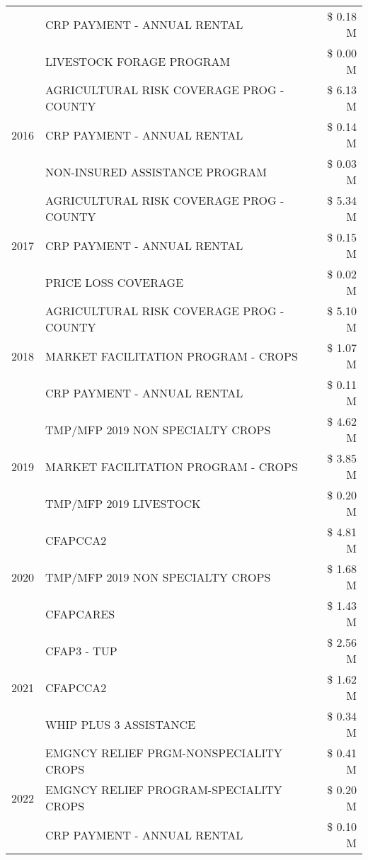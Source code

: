 \begin{tabular}{llr}
 & CRP PAYMENT - ANNUAL RENTAL & \$ 0.18 M \\
 & LIVESTOCK FORAGE PROGRAM & \$ 0.00 M \\
\cline{1-3}
\multirow[t]{3}{*}{2016} & AGRICULTURAL RISK COVERAGE PROG - COUNTY & \$ 6.13 M \\
 & CRP PAYMENT - ANNUAL RENTAL & \$ 0.14 M \\
 & NON-INSURED ASSISTANCE PROGRAM & \$ 0.03 M \\
\cline{1-3}
\multirow[t]{3}{*}{2017} & AGRICULTURAL RISK COVERAGE PROG - COUNTY & \$ 5.34 M \\
 & CRP PAYMENT - ANNUAL RENTAL & \$ 0.15 M \\
 & PRICE LOSS COVERAGE & \$ 0.02 M \\
\cline{1-3}
\multirow[t]{3}{*}{2018} & AGRICULTURAL RISK COVERAGE PROG - COUNTY & \$ 5.10 M \\
 & MARKET FACILITATION PROGRAM - CROPS & \$ 1.07 M \\
 & CRP PAYMENT - ANNUAL RENTAL & \$ 0.11 M \\
\cline{1-3}
\multirow[t]{3}{*}{2019} & TMP/MFP 2019 NON SPECIALTY CROPS & \$ 4.62 M \\
 & MARKET FACILITATION PROGRAM - CROPS & \$ 3.85 M \\
 & TMP/MFP 2019 LIVESTOCK & \$ 0.20 M \\
\cline{1-3}
\multirow[t]{3}{*}{2020} & CFAPCCA2 & \$ 4.81 M \\
 & TMP/MFP 2019 NON SPECIALTY CROPS & \$ 1.68 M \\
 & CFAPCARES & \$ 1.43 M \\
\cline{1-3}
\multirow[t]{3}{*}{2021} & CFAP3 - TUP & \$ 2.56 M \\
 & CFAPCCA2 & \$ 1.62 M \\
 & WHIP PLUS 3 ASSISTANCE & \$ 0.34 M \\
\cline{1-3}
\multirow[t]{3}{*}{2022} & EMGNCY RELIEF PRGM-NONSPECIALITY CROPS & \$ 0.41 M \\
 & EMGNCY RELIEF PROGRAM-SPECIALITY CROPS & \$ 0.20 M \\
 & CRP PAYMENT - ANNUAL RENTAL & \$ 0.10 M \\
\cline{1-3}
\bottomrule
\end{tabular}
